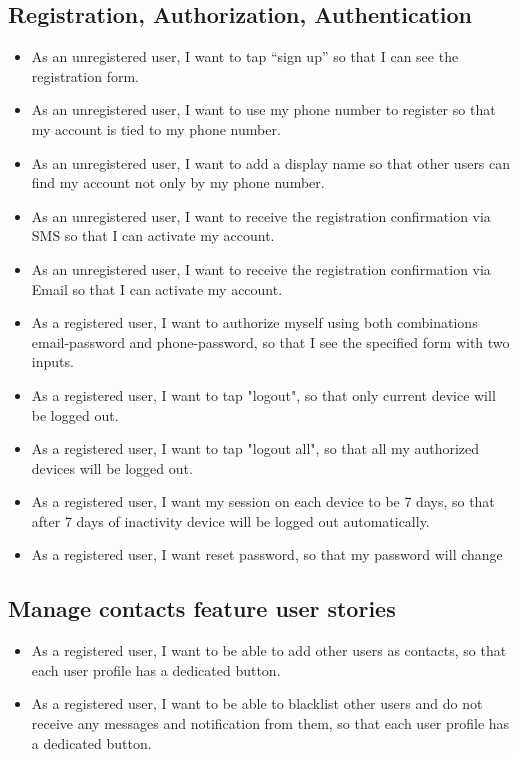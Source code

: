 \subsection{Registration, Authorization, Authentication}\label{subsec:registration-authorization-authentication}
\begin{itemize}
    \item As an unregistered user, I want to tap “sign up” so that I can see the registration form.
    \item As an unregistered user, I want to use my phone number to register so that my account is tied to my phone number.
    \item As an unregistered user, I want to add a display name so that other users can find my account not only by my phone number.
    \item As an unregistered user, I want to receive the registration confirmation via SMS so that I can activate my account.
    \item As an unregistered user, I want to receive the registration confirmation via Email so that I can activate my account.
    \item As a registered user, I want to authorize myself using both combinations email-password and phone-password, so that I see the specified form with two inputs.
    \item As a registered user, I want to tap "logout", so that only current device will be logged out.
    \item As a registered user, I want to tap "logout all", so that all my authorized devices will be logged out.
    \item As a registered user, I want my session on each device to be 7 days, so that after 7 days of inactivity device will be logged out automatically.
    \item As a registered user, I want reset password, so that my password will change
\end{itemize}

\subsection{Manage contacts feature user stories}\label{subsec:manage-contacts-feature-user-stories}
\begin{itemize}
    \item As a registered user, I want to be able to add other users as contacts, so that each user profile has a dedicated button.
    \item As a registered user, I want to be able to blacklist other users and do not receive any messages and notification from them,
    so that each user profile has a dedicated button.
\end{itemize}

